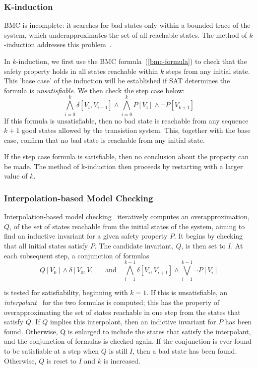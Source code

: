 \subsubsection{K-induction} 

BMC is incomplete: it searches for bad states only within a bounded trace of the system, 
which underapproximates the set of  all reachable states.  The method of 
$k$-induction addresses this problem~\cite{fmcad2000}.
  
In $k$-induction, we first use the BMC formula~(\ref{bmc-formula}) to check that the safety property
holds in all states reachable within $k$ steps from any initial state. This 'base case' of the induction will be established if SAT determines the formula is \textit{unsatisfiable}. We then check the step case below: 
%
\[\bigwedge_{i{=}0}^{k}\delta[V_i, V_{i+1}] \wedge \bigwedge_{i{=}0}^{k} P[V_i] \wedge \neg P[V_{k+1}] \]
%
If this formula is unsatisfiable, then no bad state is reachable from any sequence $k{+}1$ good states
allowed by the transistion system. This, together with the base case, confirm that no bad state is reachable from any initial state.

If the step case formula is satisfiable, then no conclusion about the property can be made. The method of k-induction then proceeds by restarting with a larger value of $k$. 


\subsubsection{Interpolation-based Model Checking} 

Interpolation-based model checking~\cite{cav03} iteratively computes an overapproximation, $Q$, of the set of states reachable from the initial states of the system, aiming to find an inductive invariant for a given safety property $P$. It begins by checking that all initial states satisfy $P$. The candidate invariant, $Q$, is then set to $I$. At each subsequent step, a conjunction of formulas
%
\[ Q[V_0] \wedge \delta[V_0,V_1] \quad\textrm{and}\quad
\bigwedge_{i{=}1}^{k{-}1}\delta[V_i, V_{i+1}] \wedge 
\bigvee_{i{=}1}^{k{-}1} \neg P[V_i] \]

\noindent is tested for satisfiability, beginning with $k{=}1$. If this is unsatisfiable, an \textit{interpolant}~\cite{mc} for the two formulas is computed; this has the property of overapproximating the set of states reachable in one step from the states that satisfy $Q$. If $Q$ implies this interpolant, then an indictive invariant for $P$ has been found. Otherwise, Q is enlarged to include the states that satisfy the interpolant, and the conjunction of formulas is checked again. If the conjunction is ever found to be satisfiable at a step when $Q$ is still $I$, then a bad state has been found. Otherwise, $Q$ is reset to $I$ and $k$ is increased.


